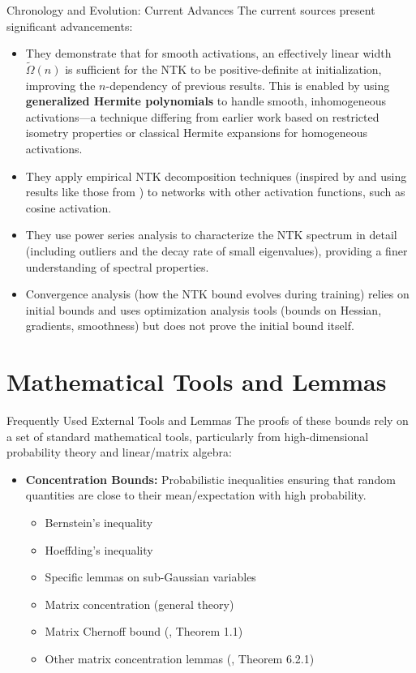 \documentclass{beamer}
\begin{document}
\begin{frame}{Chronology and Evolution: Current Advances}
  The current sources present significant advancements:
  \begin{itemize}[<+->]
    \item They demonstrate that for smooth activations, an effectively linear width $\tilde{\Omega}(n)$ is sufficient for the NTK to be positive-definite at initialization, improving the $n$-dependency of previous results. This is enabled by using \textbf{generalized Hermite polynomials} to handle smooth, inhomogeneous activations—a technique differing from earlier work based on restricted isometry properties or classical Hermite expansions for homogeneous activations.
    \item They apply empirical NTK decomposition techniques (inspired by \cite{nguyen2021tight} and using results like those from \cite{QuynhNTK2021}) to networks with other activation functions, such as cosine activation.
    \item They use power series analysis to characterize the NTK spectrum in detail (including outliers and the decay rate of small eigenvalues), providing a finer understanding of spectral properties.
    \item Convergence analysis (how the NTK bound evolves during training) relies on initial bounds and uses optimization analysis tools (bounds on Hessian, gradients, smoothness) but does not prove the initial bound itself.
  \end{itemize}
\end{frame}

\section{Mathematical Tools and Lemmas}
\begin{frame}{Frequently Used External Tools and Lemmas}
  The proofs of these bounds rely on a set of standard mathematical tools, particularly from high-dimensional probability theory and linear/matrix algebra:
  \begin{itemize}[<+->]
    \item \textbf{Concentration Bounds:} Probabilistic inequalities ensuring that random quantities are close to their mean/expectation with high probability.
    \begin{itemize}
      \item Bernstein's inequality
      \item Hoeffding's inequality
      \item Specific lemmas on sub-Gaussian variables
      \item Matrix concentration (general theory)
      \item Matrix Chernoff bound (\cite{Tropp2011}, Theorem 1.1)
      \item Other matrix concentration lemmas (\cite{vershynin2018high}, Theorem 6.2.1)
    \end{itemize}
  \end{itemize}
\end{frame}
\end{document}
